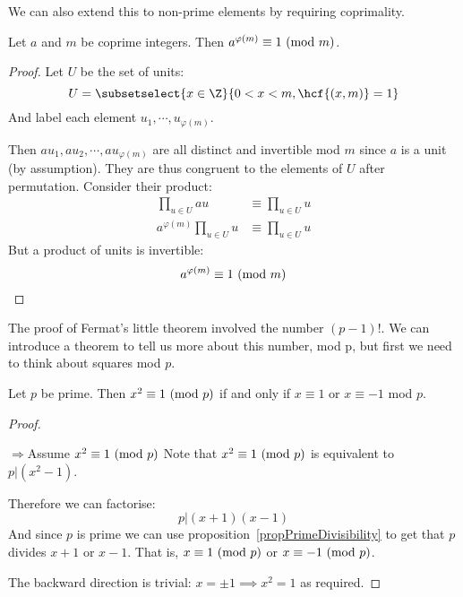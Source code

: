 \documentclass[../Main.tex]{subfiles}
\begin{document}
We can also extend this to non-prime elements by requiring coprimality.
\begin{theorem}
    \label{thmEulerFermat}
    Let $a$ and $m$ be coprime integers. Then $a^{\varphi(m)} \equiv 1~(\text{mod}~{m})$.
\end{theorem}
\begin{proof}
    Let $U$ be the set of units:
    \begin{equation*}
        U = \subsetselect{x \in \Z}{0 < x < m, \hcf{(x, m)} = 1}
    \end{equation*}
    And label each element $u_1, \cdots, u_{\varphi(m)}$.\par
    Then $a u_1, a u_2, \cdots, a u_{\varphi(m)}$ are all distinct and invertible mod $m$ since $a$ is a unit (by assumption). They are thus congruent to the elements of $U$ after permutation. Consider their product:
    \begin{align*}
        \prod_{u \in U} a u &\equiv \prod_{u \in U} u \\
        a^{\varphi(m)} \prod_{u \in U} u &\equiv \prod_{u \in U} u
    \end{align*}
    But a product of units is invertible:
    \begin{equation*}
        a^{\varphi(m)} \equiv 1~(\text{mod}~{m})
    \end{equation*}
\end{proof}
The proof of Fermat's little theorem involved the number $(p-1)!$. We can introduce a theorem to tell us more about this number, mod p, but first we need to think about squares mod $p$.
\begin{lemma}
    Let $p$ be prime. Then $x^2 \equiv 1~(\text{mod}~{p})$ if and only if $x \equiv 1$ or $x \equiv -1$ mod $p$.
    \label{lemSqrt1ModP}
\end{lemma}
\begin{proof}
    \begin{proofdirection}{$\Rightarrow$}{Assume $x^2 \equiv 1~(\text{mod}~{p})$}
        Note that $x^2 \equiv 1~(\text{mod}~{p})$ is equivalent to $p | (x^2 - 1)$.\par
        Therefore we can factorise:
        \begin{equation*}
            p | (x + 1)(x - 1)
        \end{equation*}
        And since $p$ is prime we can use proposition~\ref{propPrimeDivisibility} to get that $p$ divides $x+1$ or $x-1$. That is, $x \equiv 1~(\text{mod}~{p})$ or $x \equiv -1~(\text{mod}~{p})$.
    \end{proofdirection}
    The backward direction is trivial: $x = \pm 1 \implies x^2 = 1$ as required.
\end{proof}
\end{document}
